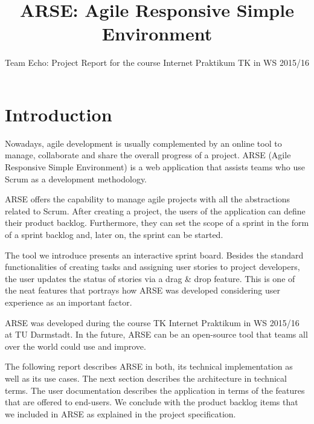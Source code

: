 \documentclass[
	accentcolor=tud1a %
]{tudreport}
\begin{document}
\title{ARSE: Agile Responsive Simple Environment}
\subtitle{Team Echo: Project Report for the course Internet Praktikum TK in WS 2015/16}

\maketitle

\tableofcontents

\chapter{Introduction}
\label{ch:introduction}

Nowadays, agile development is usually complemented by an online tool to manage, collaborate and share the overall progress of a project. ARSE (Agile Responsive Simple Environment) is a web application that assists teams who use Scrum as a development methodology. 

ARSE offers the capability to manage agile projects with all the abstractions related to Scrum. After creating a project, the users of the application can define their product backlog. Furthermore, they can set the scope of a sprint in the form of a sprint backlog and, later on, the sprint can be started. 

The tool we introduce presents an interactive sprint board. Besides the standard functionalities of creating tasks and assigning user stories to project developers, the user updates the status of stories via a drag \& drop feature. This is one of the neat features that portrays how ARSE was developed considering user experience as an important factor.

ARSE was developed during the course TK Internet Praktikum in WS 2015/16 at TU Darmstadt. In the future, ARSE can be an open-source tool that teams all over the world could use and improve. 

The following report describes ARSE in both, its technical implementation as well as its use cases. The next section describes the architecture in technical terms. The user documentation describes the application in terms of the features that are offered to end-users. We conclude with the product backlog items that we included in ARSE as explained in the project specification. 
\end{document}
